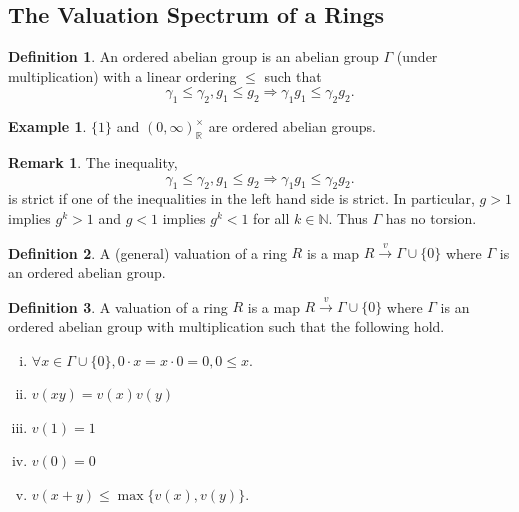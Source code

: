 \documentclass[10pt]{article}
\numberwithin{equation}{section}
\theoremstyle{definition}
\newtheorem{definition}{Definition}[subsection]
\newtheorem{remark}{Remark}[subsection]
\newtheorem{example}{Example}[subsection]
\newcommand{\N}[0]{\mathbb{N}}
\newcommand{\R}[0]{\mathbb{R}}
\begin{document}
\subsection{The Valuation Spectrum of a Rings}

\begin{definition}
    \label{definition_1_ordered_abelian_group}
    An ordered abelian group is an abelian group $\Gamma$ (under multiplication) with a linear ordering $\leq$ such that
    \begin{equation*}
        \gamma_1\leq \gamma_2, g_1\leq g_2\Rightarrow \gamma_1g_1\leq \gamma_2g_2.
    \end{equation*}
\end{definition}

\begin{example}
    $\{1\}$ and $(0,\infty)_\R^\times$ are ordered abelian groups.
\end{example}

\begin{remark}
    The inequality,
    \begin{equation*}
        \gamma_1\leq \gamma_2, g_1\leq g_2\Rightarrow \gamma_1g_1\leq \gamma_2g_2.
    \end{equation*}
    is strict if one of the inequalities in the left hand side is strict.
    In particular, $g>1$ implies $g^k>1$ and $g<1$ implies $g^k<1$ for all $k\in\N$. Thus $\Gamma$ has no torsion.
\end{remark}

\begin{definition}
    \label{definition_1_valuation_rings}
    A (general) valuation of a ring $R$ is a map $R\stackrel{v}{\to}\Gamma\cup\{0\}$ where $\Gamma$ is an ordered abelian group.
\end{definition}

\begin{definition}
    \label{definition_5_2}
    A valuation of a ring $R$ is a map $R\stackrel{v}{\to}\Gamma\cup\{0\}$ where $\Gamma$ is an ordered abelian group with multiplication such that the following hold.
    \begin{enumerate}[i.]
        \item $\forall x\in\Gamma\cup\{0\}, 0\cdot x = x\cdot 0 = 0, 0\leq x$.
        \item $v(xy) = v(x)v(y)$
        \item $v(1) = 1$
        \item $v(0) = 0$
        \item $v(x+y)\leq \max\{v(x),v(y)\}$.
    \end{enumerate}
\end{definition}
\end{document}
